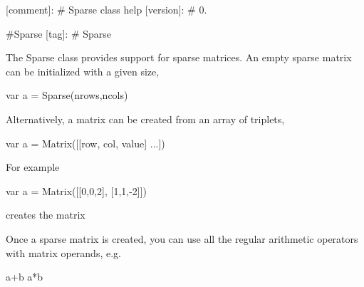 \mbox{[}comment\mbox{]}\+: \# Sparse class help \mbox{[}version\mbox{]}\+: \# 0.

\#\+Sparse \mbox{[}tag\mbox{]}\+: \# Sparse

The Sparse class provides support for sparse matrices. An empty sparse matrix can be initialized with a given size, \begin{DoxyVerb}var a = Sparse(nrows,ncols)
\end{DoxyVerb}


Alternatively, a matrix can be created from an array of triplets, ~\newline
 \begin{DoxyVerb}var a = Matrix([[row, col, value] ...])
\end{DoxyVerb}


For example \begin{DoxyVerb}var a = Matrix([[0,0,2], [1,1,-2]])
\end{DoxyVerb}


creates the matrix \begin{DoxyVerb}[ 2 0 ]
[ 0 -2 ]
\end{DoxyVerb}


Once a sparse matrix is created, you can use all the regular arithmetic operators with matrix operands, e.\+g. \begin{DoxyVerb}a+b
a*b
\end{DoxyVerb}
 